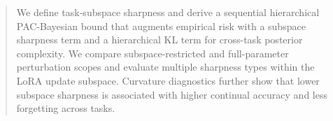 \documentclass{article}
\theoremstyle{plain}
\theoremstyle{definition}
\theoremstyle{remark}
\begin{document}
\begin{abstract}
We define task-subspace sharpness and derive a sequential hierarchical PAC-Bayesian bound that augments empirical risk with a subspace sharpness term and a hierarchical KL term for cross-task posterior complexity.
We compare subspace-restricted and full-parameter perturbation scopes and evaluate multiple sharpness types within the LoRA update subspace.
Curvature diagnostics further show that lower subspace sharpness is associated with higher continual accuracy and less forgetting across tasks. 
\end{abstract}

\end{document}
